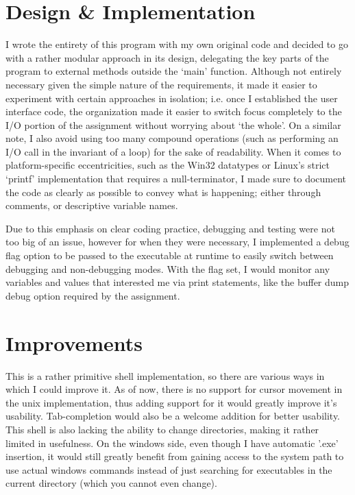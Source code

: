 \documentclass[12pt]{article}
\begin{document}
\section*{Design \& Implementation}
I wrote the entirety of this program with my own original code and decided to go with a rather modular approach in its design, delegating the key 
parts of the program to external methods outside the `main' function.  Although not entirely necessary given the simple nature of the requirements, 
it made it easier to experiment with certain approaches in isolation; i.e. once I established the user interface code, the organization made it easier 
to switch focus completely to the I/O portion of the assignment without worrying about `the whole'.  On a similar note, I also avoid using too many 
compound operations (such as performing an I/O call in the invariant of a loop) for the sake of readability.  When it comes to platform-specific 
eccentricities, such as the Win32 datatypes or Linux's strict `printf' implementation that requires a null-terminator, I made sure to document the code 
as clearly as possible to convey what is happening; either through comments, or descriptive variable names. 

Due to this emphasis on clear coding practice, debugging and testing were not too big of an issue, however for when they were necessary, I implemented
a debug flag option to be passed to the executable at runtime to easily switch between debugging and non-debugging modes. With the flag set, I would
monitor any variables and values that interested me via print statements, like the buffer dump debug option required by the assignment. 


\section*{Improvements}
This is a rather primitive shell implementation, so there are various ways in which I could improve it. As of now, there is no support for cursor movement
in the unix implementation, thus adding support for it would greatly improve it's usability. Tab-completion would also be a welcome addition for better 
usability. This shell is also lacking the ability to change directories, making it rather limited in usefulness. On the windows side, even though I have
automatic '.exe' insertion, it would still greatly benefit from gaining access to the system path to use actual windows commands instead of just searching
for executables in the current directory (which you cannot even change).
\end{document}
